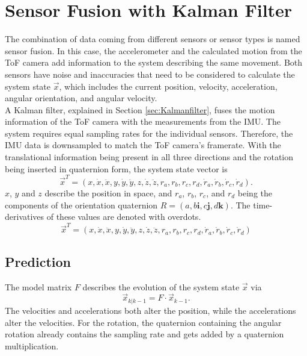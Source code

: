 \section{Sensor Fusion with Kalman Filter}
\label{sec:SensorFusion}
The combination of data coming from different sensors or sensor types is named sensor fusion. In this case, the accelerometer and the calculated motion from the ToF camera add information to the system describing the same movement. Both sensors have noise and inaccuracies that need to be considered to calculate the system state $\vec{x}$, which includes the current position, velocity, acceleration, angular orientation, and angular velocity.\\
A Kalman filter, explained in Section \ref{sec:Kalmanfilter}, fuses the motion information of the ToF camera with the measurements from the IMU. The system requires equal sampling rates for the individual sensors. Therefore, the IMU data is downsampled to match the ToF camera's framerate.
With the translational information being present in all three directions and the rotation being inserted in quaternion form, the system state vector is
\begin{equation*}
    \vec{x}^{T} = (
        x, \dot{x}, \ddot{x}, y, \dot{y}, \ddot{y}, z, \dot{z}, \ddot{z}, r_{a}, r_{b}, r_{c}, r_{d}, \dot{r}_{a}, \dot{r}_{b}, \dot{r}_{c}, \dot{r}_{d}).
\end{equation*}
$x$, $y$ and $z$ describe the position in space, and $r_{a}$, $r_{b}$, $r_{c}$, and $r_{d}$ being the components of the orientation quaternion $R = (a, b\textbf{i}, c\textbf{j}, d\textbf{k})$. The time-derivatives of these values are denoted with overdots.
\begin{equation*}
    \vec{x}^{T} = (
        x, \dot{x}, \ddot{x}, y, \dot{y}, \ddot{y}, z, \dot{z}, \ddot{z}, r_{a}, r_{b}, r_{c}, r_{d}, \dot{r}_{a}, \dot{r}_{b}, \dot{r}_{c}, \dot{r}_{d})
\end{equation*}
\subsection{Prediction}
\label{sec:KalmanPrediction}
The model matrix $F$ describes the evolution of the system state $\vec{x}$ via \begin{equation*}
    \vec{x}_{k|k-1} = 
    F
    \cdot
    \vec{x}_{k-1}.
\end{equation*} 
The velocities and accelerations both alter the position, while the accelerations alter the velocities. For the rotation, the quaternion containing the angular rotation already contains the sampling rate and gets added by a quaternion multiplication. 

